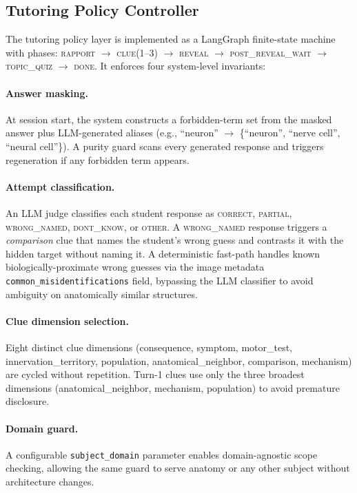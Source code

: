 \documentclass[11pt]{article}
\begin{document}
\subsection{Tutoring Policy Controller}

The tutoring policy layer is implemented as a LangGraph
\citep{langgraph_docs} finite-state machine with phases:
\textsc{rapport} $\to$ \textsc{clue}(1--3) $\to$ \textsc{reveal} $\to$
\textsc{post\_reveal\_wait} $\to$ \textsc{topic\_quiz} $\to$ \textsc{done}.
It enforces four system-level invariants:

\paragraph{Answer masking.}
At session start, the system constructs a forbidden-term set from the masked
answer plus LLM-generated aliases (e.g., ``neuron'' $\to$
\{``neuron'', ``nerve cell'', ``neural cell''\}).
A purity guard scans every generated response and triggers regeneration if
any forbidden term appears.

\paragraph{Attempt classification.}
An LLM judge classifies each student response as \textsc{correct},
\textsc{partial}, \textsc{wrong\_named}, \textsc{dont\_know}, or
\textsc{other}.
A \textsc{wrong\_named} response triggers a \emph{comparison} clue that
names the student's wrong guess and contrasts it with the hidden target
without naming it.
A deterministic fast-path handles known biologically-proximate wrong guesses
via the image metadata \texttt{common\_misidentifications} field,
bypassing the LLM classifier to avoid ambiguity on anatomically similar
structures.

\paragraph{Clue dimension selection.}
Eight distinct clue dimensions (consequence, symptom, motor\_test,
innervation\_territory, population, anatomical\_neighbor, comparison,
mechanism) are cycled without repetition.
Turn-1 clues use only the three broadest dimensions
(anatomical\_neighbor, mechanism, population) to avoid premature disclosure.

\paragraph{Domain guard.}
A configurable \texttt{subject\_domain} parameter enables domain-agnostic
scope checking, allowing the same guard to serve anatomy or any other
subject without architecture changes.
\end{document}
